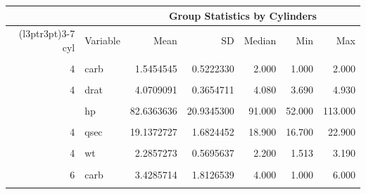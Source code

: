 \begin{table}[!h]
\centering
\begin{tabular}{rlrrrrr}
\toprule
\multicolumn{2}{c}{ } & \multicolumn{5}{c}{Group Statistics by Cylinders} \\
\cmidrule(l{3pt}r{3pt}){3-7}
cyl & Variable & Mean & SD & Median & Min & Max\\
\midrule
\cellcolor{gray!10}{4} & \cellcolor{gray!10}{am} & \cellcolor{gray!10}{0.7272727} & \cellcolor{gray!10}{0.4670994} & \cellcolor{gray!10}{1.000} & \cellcolor{gray!10}{0.000} & \cellcolor{gray!10}{1.000}\\
4 & carb & 1.5454545 & 0.5222330 & 2.000 & 1.000 & 2.000\\
\cellcolor{gray!10}{4} & \cellcolor{gray!10}{disp} & \cellcolor{gray!10}{105.1363636} & \cellcolor{gray!10}{26.8715937} & \cellcolor{gray!10}{108.000} & \cellcolor{gray!10}{71.100} & \cellcolor{gray!10}{146.700}\\
4 & drat & 4.0709091 & 0.3654711 & 4.080 & 3.690 & 4.930\\
\cellcolor{gray!10}{4} & \cellcolor{gray!10}{gear} & \cellcolor{gray!10}{4.0909091} & \cellcolor{gray!10}{0.5393599} & \cellcolor{gray!10}{4.000} & \cellcolor{gray!10}{3.000} & \cellcolor{gray!10}{5.000}\\
\addlinespace
4 & hp & 82.6363636 & 20.9345300 & 91.000 & 52.000 & 113.000\\
\cellcolor{gray!10}{4} & \cellcolor{gray!10}{mpg} & \cellcolor{gray!10}{26.6636364} & \cellcolor{gray!10}{4.5098277} & \cellcolor{gray!10}{26.000} & \cellcolor{gray!10}{21.400} & \cellcolor{gray!10}{33.900}\\
4 & qsec & 19.1372727 & 1.6824452 & 18.900 & 16.700 & 22.900\\
\cellcolor{gray!10}{4} & \cellcolor{gray!10}{vs} & \cellcolor{gray!10}{0.9090909} & \cellcolor{gray!10}{0.3015113} & \cellcolor{gray!10}{1.000} & \cellcolor{gray!10}{0.000} & \cellcolor{gray!10}{1.000}\\
4 & wt & 2.2857273 & 0.5695637 & 2.200 & 1.513 & 3.190\\
\addlinespace
\cellcolor{gray!10}{6} & \cellcolor{gray!10}{am} & \cellcolor{gray!10}{0.4285714} & \cellcolor{gray!10}{0.5345225} & \cellcolor{gray!10}{0.000} & \cellcolor{gray!10}{0.000} & \cellcolor{gray!10}{1.000}\\
6 & carb & 3.4285714 & 1.8126539 & 4.000 & 1.000 & 6.000\\
\cellcolor{gray!10}{6} & \cellcolor{gray!10}{disp} & \cellcolor{gray!10}{183.3142857} & \cellcolor{gray!10}{41.5624602} & \cellcolor{gray!10}{167.600} & \cellcolor{gray!10}{145.000} & \cellcolor{gray!10}{258.000}\\

\end{tabular}
\end{table}

